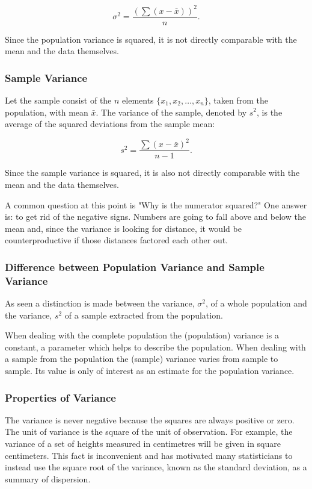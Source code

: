 \begin{equation}
\sigma^2 = \frac{(\sum(x - \bar{x}))^2}{n}.
\label{eq:popvariance}
\end{equation}

Since the population variance is squared, it is not directly comparable with the mean and the data themselves.

\subsubsection{Sample Variance}
Let the sample consist of the $n$ elements $\{x_1,x_2,\ldots,x_n\}$, taken from the population, with mean $\bar{x}$. The variance of the sample, denoted by $s^2$, is the average of the squared deviations from the sample mean:

\begin{equation}
s^2 = \frac{\sum(x - \bar{x})^2}{n-1}.
\end{equation}

Since the sample variance is squared, it is also not directly comparable with the mean and the data themselves.

A common question at this point is "Why is the numerator squared?" One answer is: to get rid of the negative signs. Numbers are going to fall above and below the mean and, since the variance is looking for distance, it would be counterproductive if those distances factored each other out.

\subsubsection{Difference between Population Variance and Sample Variance}
As seen a distinction is made between the variance, $\sigma^2$, of a whole population and the variance, $s^2$ of a sample extracted from the population.

When dealing with the complete population the (population) variance is a constant, a parameter which helps to describe the population. When dealing with a sample from the population the (sample) variance varies from sample to sample. Its value is only of interest as an estimate for the population variance.

\subsubsection{Properties of Variance}
The variance is never negative because the squares are always positive or zero. The unit of variance is the square of the unit of observation. For example, the variance of a set of heights measured in centimetres will be given in square centimeters. This fact is inconvenient and has motivated many statisticians to instead use the square root of the variance, known as the standard deviation, as a summary of dispersion.

